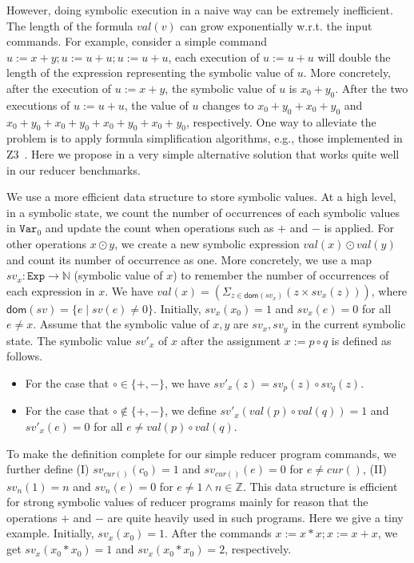 \documentclass{llncs}
\newcommand{\Var}{\mathtt{Var}}
\newcommand{\Exp}{\mathtt{Exp}}
\newcommand{\cur}{cur()}
\newcommand{\dom}[1]{\mathsf{dom}(#1)}
\newcommand{\Z}{\mathbb{Z}}
\begin{document}
{However, doing symbolic execution in a naive way can be extremely inefficient.
The length of the formula $val(v)$ can grow exponentially w.r.t. the input commands. For example, consider a simple command $u:=x+y;u:=u+u;u:=u+u$, each execution of $u:= u+ u$ will double the length of the expression representing the symbolic value of $u$. More concretely, after the execution of $u:=x+y$, the symbolic value of $u$ is $x_0+y_0$. After the two executions of $u:=u+u$, the value of $u$ changes to $x_0+y_0+x_0+y_0$ and $x_0+y_0+x_0+y_0+x_0+y_0+x_0+y_0$, respectively. One way to alleviate the problem is to apply formula simplification algorithms, e.g., those implemented in Z3~\cite{z3}.
Here we propose in a very simple alternative solution that works quite well in our reducer benchmarks.

We use a more efficient data structure to store symbolic values. At a high level, in a symbolic state, we count the number of occurrences of each symbolic values in $\Var_0$ and update the count when operations such as $+$ and $-$ is applied. For other operations $x\odot y$, we create a new symbolic expression $val(x) \odot val(y)$ and count its number of occurrence as one.
More concretely, we use a map $sv_x:\Exp\rightarrow \mathbb{N}$ (symbolic value of $x$) to remember the number of occurrences of each expression in $x$. We have $val(x)= (\Sigma_{z\in \dom{sv_x}} (z\times sv_x(z)) )$, where $\dom{sv}=\{e\mid sv(e)\neq 0\}$.
Initially, $sv_x(x_0) = 1$ and $sv_x (e) =0$ for all $e\neq x$. Assume that the symbolic value of $x,y$ are $sv_x,sv_y$ in the current symbolic state. The symbolic value $sv'_x$ of $x$ after the assignment $x:=p\circ q$ is defined as follows.

\begin{itemize}
	\item For the case that $\circ \in\{+,-\}$, we have $sv'_x(z) = sv_p(z)\circ  sv_q(z)$.
	\item For the case that $\circ \notin\{+,-\}$, we define $sv'_x(val(p) \circ val(q)) =1$ and $sv'_x(e) = 0$ for all $e\neq val(p) \circ val(q)$.
\end{itemize}
To make the definition complete for our simple reducer program commands, we further define (I) $sv_{\cur}(c_0) =1$ and $sv_{\cur}(e)=0$ for $e\neq \cur$, (II) $sv_{n}(1) =n$ and $sv_{n}(e)=0$ for $e\neq 1 \wedge n\in \Z$.
This data structure is efficient for strong symbolic values of reducer programs mainly for reason that the operations $+$ and $-$ are quite heavily used in such programs.
Here we give a tiny example. Initially, $sv_x(x_0)=1$. After the commands $x:=x*x;x:=x+x$, we get $sv_x(x_0*x_0)=1$ and $sv_x(x_0*x_0)=2$, respectively.}
\end{document}
